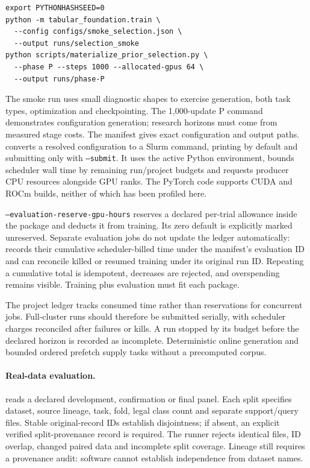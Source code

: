 \documentclass[11pt]{article}
\begin{document}
\begin{lstlisting}
export PYTHONHASHSEED=0
python -m tabular_foundation.train \
  --config configs/smoke_selection.json \
  --output runs/selection_smoke
python scripts/materialize_prior_selection.py \
  --phase P --steps 1000 --allocated-gpus 64 \
  --output runs/phase-P
\end{lstlisting}

The smoke run uses small diagnostic shapes to exercise generation, both task types, optimization and checkpointing. The 1,000-update P command demonstrates configuration generation; research horizons must come from measured stage costs. The manifest gives exact configuration and output paths.  converts a resolved configuration to a Slurm command, printing by default and submitting only with \texttt{--submit}. It uses the active Python environment, bounds scheduler wall time by remaining run/project budgets and requests producer CPU resources alongside GPU ranks. The PyTorch code supports CUDA and ROCm builds, neither of which has been profiled here.

\texttt{--evaluation-reserve-gpu-hours} reserves a declared per-trial allowance inside the package and deducts it from training. Its zero default is explicitly marked unreserved. Separate evaluation jobs do not update the ledger automatically:  records their cumulative scheduler-billed time under the manifest's evaluation ID and can reconcile killed or resumed training under its original run ID. Repeating a cumulative total is idempotent, decreases are rejected, and overspending remains visible. Training plus evaluation must fit each package.

The project ledger tracks consumed time rather than reservations for concurrent jobs. Full-cluster runs should therefore be submitted serially, with scheduler charges reconciled after failures or kills. A run stopped by its budget before the declared horizon is recorded as incomplete. Deterministic online generation and bounded ordered prefetch supply tasks without a precomputed corpus.

\paragraph{Real-data evaluation.}
 reads a declared development, confirmation or final panel. Each split specifies dataset, source lineage, task, fold, legal class count and separate support/query files. Stable original-record IDs establish disjointness; if absent, an explicit verified split-provenance record is required. The runner rejects identical files, ID overlap, changed paired data and incomplete split coverage. Lineage still requires a provenance audit: software cannot establish independence from dataset names.
\end{document}

